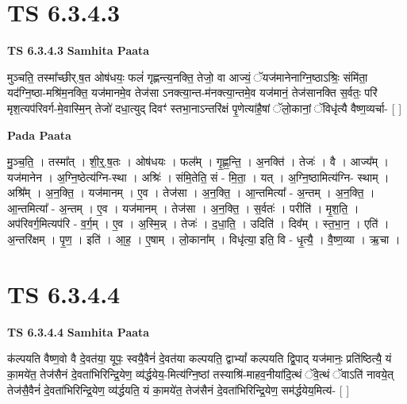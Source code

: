 \documentclass[17pt]{extarticle}
\begin{document}
\section*{ TS 6.3.4.3 }

\textbf{TS 6.3.4.3 } \newline
\textbf{Samhita Paata} \newline

मुञ्चति॒ तस्मा᳚च्छीर्.ष॒त ओष॑धयः॒ फलं॑ गृह्णन्त्य॒नक्ति॒ तेजो॒ वा आज्यं॒ ॅयज॑मानेनाग्नि॒ष्ठाऽश्रिः॒ संमि॑ता॒ यद॑ग्नि॒ष्ठा-मश्रि॑म॒नक्ति॒ यज॑मानमे॒व तेज॑सा ऽनक्त्या॒न्त-म॑नक्त्या॒न्तमे॒व यज॑मानं॒ तेज॑सानक्ति स॒र्वतः॒ परि॑ मृश॒त्यप॑रिवर्ग-मे॒वास्मि॒न् तेजो॑ दधा॒त्युद् दिवꣳ॑ स्तभा॒नाऽन्तरि॑क्षं पृ॒णेत्या॑है॒षां ॅलो॒कानां॒ ॅविधृ॑त्यै वैष्ण॒व्यर्चा- [  ] \newline

\textbf{Pada Paata} \newline

मु॒ञ्च॒ति॒ । तस्मा᳚त् । शी॒र्॒.ष॒तः । ओष॑धयः । फल᳚म् । गृ॒ह्ण॒न्ति॒ । अ॒नक्ति॑ । तेजः॑ । वै । आज्य᳚म् । यज॑मानेन । अ॒ग्नि॒ष्ठेत्य॑ग्नि-स्था । अश्रिः॑ । संमि॒तेति॒ सं - मि॒ता॒ । यत् । अ॒ग्नि॒ष्ठामित्य॑ग्नि- स्थाम् । अश्रि᳚म् । अ॒न॒क्ति॒ । यज॑मानम् । ए॒व । तेज॑सा । अ॒न॒क्ति॒ । आ॒न्तमित्या᳚ - अ॒न्तम् । अ॒न॒क्ति॒ । आ॒न्तमित्या᳚ - अ॒न्तम् । ए॒व । यज॑मानम् । तेज॑सा । अ॒न॒क्ति॒ । स॒र्वतः॑ । परीति॑ । मृ॒श॒ति॒ । अप॑रिवर्ग॒मित्यप॑रि - व॒र्ग॒म् । ए॒व । अ॒स्मि॒न्न् । तेजः॑ । द॒धा॒ति॒ । उदिति॑ । दिव᳚म् । स्त॒भा॒न॒ । एति॑ । अ॒न्तरि॑क्षम् । पृ॒ण॒ । इति॑ । आ॒ह॒ । ए॒षाम् । लो॒काना᳚म् । विधृ॑त्या॒ इति॒ वि - धृ॒त्यै॒ । वै॒ष्ण॒व्या । ऋ॒चा ।  \newline




\section*{ TS 6.3.4.4 }

\textbf{TS 6.3.4.4 } \newline
\textbf{Samhita Paata} \newline

क॑ल्पयति वैष्ण॒वो वै दे॒वत॑या॒ यूपः॒ स्वयै॒वैनं॑ दे॒वत॑या कल्पयति॒ द्वाभ्यां᳚ कल्पयति द्वि॒पाद् यज॑मानः॒ प्रति॑ष्ठित्यै॒ यं का॒मये॑त॒ तेज॑सैनं दे॒वता॑भिरिन्द्रि॒येण॒ व्य॑र्द्धयेय॒-मित्य॑ग्नि॒ष्ठां तस्याश्रि॑-माहव॒नीया॑दि॒त्थं ॅवे॒त्थं ॅवाऽति॑ नावये॒त् तेज॑सै॒वैनं॑ दे॒वता॑भिरिन्द्रि॒येण॒ व्य॑र्द्धयति॒ यं का॒मये॑त॒ तेज॑सैनं दे॒वता॑भिरिन्द्रि॒येण॒ सम॑र्द्धयेय॒मित्य॑- [  ] \newline
\end{document}
